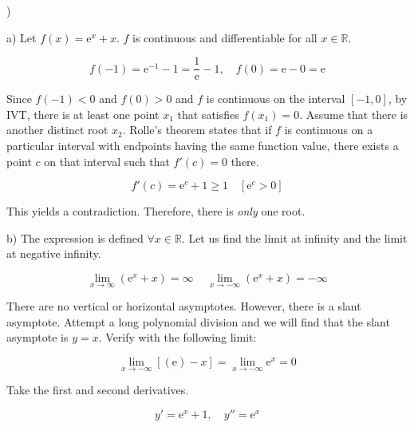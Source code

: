 \documentclass{article}
\begin{document}
)

\hfill

\noindent a) Let $f(x) = \mathrm{e}^x + x$. $f$ is continuous and differentiable for all $x\in\mathbb{R}$.

\begin{equation*}
    f(-1) = \mathrm{e}^{-1} -1 = \frac1{\mathrm{e}} - 1, \quad f(0) = \mathrm{e} - 0 = \mathrm{e}
\end{equation*}

\hfill

\noindent Since $f(-1) < 0$ and $f(0) > 0$ and $f$ is continuous on the interval $[-1, 0]$, by IVT, there is at least one point $x_1$ that satisfies $f(x_1) = 0$. Assume that there is another distinct root $x_2$. Rolle's theorem states that if $f$ is continuous on a particular interval with endpoints having the same function value, there exists a point $c$ on that interval such that $f'(c) = 0$ there.

\begin{equation*}
f'(c) = \mathrm{e}^c + 1 \geq 1 \quad [\mathrm{e}^c > 0]
\end{equation*}

\hfill

\noindent This yields a contradiction. Therefore, there is \textit{only} one root.

\hfill

\noindent b) The expression is defined $\forall x\in \mathbb{R}$. Let us find the limit at infinity and the limit at negative infinity.

\begin{equation*}\lim_{x\to \infty}(\mathrm{e}^x+x)=\infty\,\quad\lim_{x\to -\infty}(\mathrm{e}^x+x)=-\infty\end{equation*}

\hfill

\noindent There are no vertical or horizontal asymptotes. However, there is a slant asymptote. Attempt a long polynomial division and we will find that the slant asymptote is $y=x$. Verify with the following limit:

\begin{equation*}\lim_{x\to-\infty}\left[(\mathrm{e})-x\right]=\lim_{x\to-\infty}\mathrm{e}^x=0\end{equation*}

\hfill 

\noindent Take the first and second derivatives.

\begin{equation*}y' = \mathrm{e}^x + 1,\quad y'' = \mathrm{e}^x\end{equation*}
\end{document}
